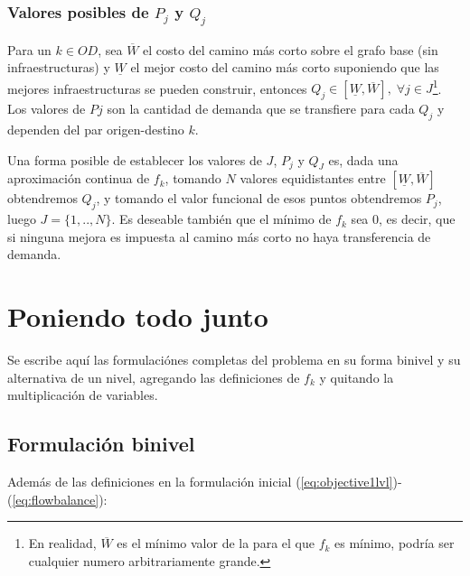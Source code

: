 \documentclass{article}
\begin{document}
  \subsubsection*{Valores posibles de $P_j$ y $Q_j$}

  Para un $k \in OD$, sea $\overline{W}$ el costo del camino más corto sobre el grafo base (sin infraestructuras) y $\underline{W}$ el mejor costo del camino más corto suponiendo que las mejores infraestructuras se pueden construir, entonces $Q_j \in [\underline{W}, \overline{W}],\; \forall j \in J$\footnote{En realidad, $\overline{W}$ es el mínimo valor de la para el que $f_k$ es mínimo, podría ser cualquier numero arbitrariamente grande.}. Los valores de $Pj$ son la cantidad de demanda que se transfiere para cada $Q_j$ y dependen del par origen-destino $k$.

  Una forma posible de establecer los valores de $J$, $P_j$ y $Q_J$ es, dada una aproximación continua de $f_k$, tomando $N$ valores equidistantes entre $[\underline{W}, \overline{W}]$ obtendremos $Q_j$, y tomando el valor funcional de esos puntos obtendremos $P_j$, luego $J=\{1,..,N\}$. Es deseable también que el mínimo de $f_k$ sea 0, es decir, que si ninguna mejora es impuesta al camino más corto no haya transferencia de demanda.

  \section*{Poniendo todo junto}

  Se escribe aquí las formulaciónes completas del problema en su forma binivel y su alternativa de un nivel, agregando las definiciones de $f_k$ y quitando la multiplicación de variables.

  \subsection*{Formulación binivel}

  Además de las definiciones en la formulación inicial (\ref{eq:objective1lvl})-(\ref{eq:flowbalance}):
\end{document}
